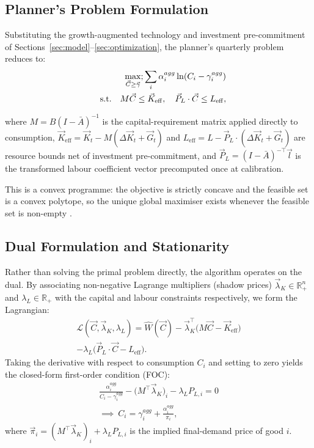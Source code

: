 \subsection{Planner's Problem Formulation}

Substituting the growth-augmented technology and investment
pre-commitment of Sections~\ref{sec:model}--\ref{sec:optimization},
the planner's quarterly problem reduces to:
%
\begin{align}\label{eq:solver problem}
\max_{\vec{C}\geq \vec{\gamma}};\sum_i \alpha^{agg}_i \ln (C_i - \gamma^{agg}_i) \notag \\
  \quad\text{s.t.}\quad
  M\vec{C} \leq \vec{K}_{\mathrm{eff}},\quad
  \vec{P}_{L} \cdot \vec{C} \leq L_{\mathrm{eff}},
\end{align}

%
where $M = B(I-\bar{A})^{-1}$ is the capital-requirement matrix
applied directly to consumption,
$\vec{K}_{\mathrm{eff}} = \vec{K}_t - M (\Delta\vec{K}_t + \vec{G}_{t})$  and
$L_{\mathrm{eff}} = L - \vec{P}_{L} \cdot ( \Delta\vec{K}_t + \vec{G}_{t})$
are resource bounds net of investment pre-commitment, and
$\vec{P}_{L} = (I-\bar{A})^{-\top}\vec{l}$ is the
transformed labour coefficient vector precomputed once at calibration.

This is a convex programme: the objective is strictly concave and the
feasible set is a convex polytope, so the unique global maximiser exists
whenever the feasible set is non-empty \citep{boyd2004convex}.

\subsection{Dual Formulation and Stationarity}

Rather than solving the primal problem directly, the algorithm operates on the dual.
By associating non-negative Lagrange multipliers (shadow prices) $\vec{\lambda}_K \in \mathbb{R}^n_+$ and $\lambda_L \in \mathbb{R}_+$ with the capital and labour constraints respectively, we form the Lagrangian:
%
\begin{multline} \label{eq:lagrangian effective}
  \mathcal{L}(\vec{C}, \vec{\lambda}_K, \lambda_L) = \hat{W}(\vec{C})
     - \vec{\lambda}_K^\top \bigl(M\vec{C} - \vec{K}_{\mathrm{eff}}\bigr)\\
    - \lambda_L \bigl(\vec{P}_{L} \cdot \vec{C} - L_{\mathrm{eff}}\bigr).
\end{multline}
%
Taking the derivative with respect to consumption $C_i$ and setting to zero yields the closed-form first-order condition (FOC):
%
\begin{multline} \label{eq:foc}
     \frac{\alpha^{agg}_i}{C_i - \gamma^{agg}_i} - \bigl(M^\top \vec{\lambda}_K\bigr)_i - \lambda_L P_{L, i} = 0 \\ \implies \ C_i = \gamma^{agg}_i + \frac{\alpha^{agg}_i}{\pi_i},
\end{multline}
%
where $\vec{\pi}_i = (M^\top \vec{\lambda}_K)_i + \lambda_L {P}_{L,i}$ is the implied final-demand price of good $i$.
